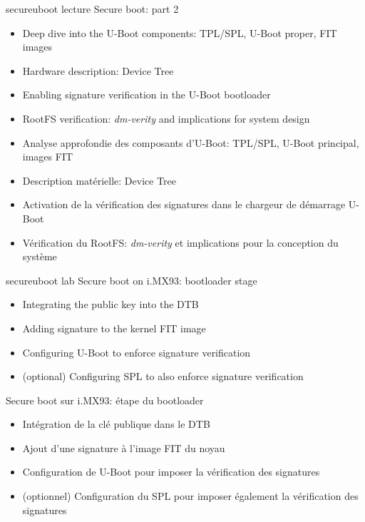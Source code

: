 {secureuboot}
{lecture}
{Secure boot: part 2}
{
  \begin{itemize}
  \item Deep dive into the U-Boot components: TPL/SPL, U-Boot proper,
    FIT images
  \item Hardware description: Device Tree
  \item Enabling signature verification in the U-Boot bootloader
  \item RootFS verification: {\em dm-verity} and implications for system
    design
  \end{itemize}
}
{}
{
  \begin{itemize}
  \item Analyse approfondie des composants d’U-Boot: TPL/SPL, U-Boot principal, images FIT
  \item Description matérielle: Device Tree
  \item Activation de la vérification des signatures dans le chargeur de démarrage U-Boot
  \item Vérification du RootFS: {\em dm-verity} et implications pour la conception du système
  \end{itemize}
}

{secureuboot}
{lab}
{Secure boot on i.MX93: bootloader stage}
{
  \begin{itemize}
  \item Integrating the public key into the DTB
  \item Adding signature to the kernel FIT image
  \item Configuring U-Boot to enforce signature verification
  \item (optional) Configuring SPL to also enforce signature verification
  \end{itemize}
}
{Secure boot sur i.MX93: étape du bootloader}
{
  \begin{itemize}
  \item Intégration de la clé publique dans le DTB
  \item Ajout d’une signature à l’image FIT du noyau
  \item Configuration de U-Boot pour imposer la vérification des signatures
  \item (optionnel) Configuration du SPL pour imposer également la vérification des signatures
  \end{itemize}
}

